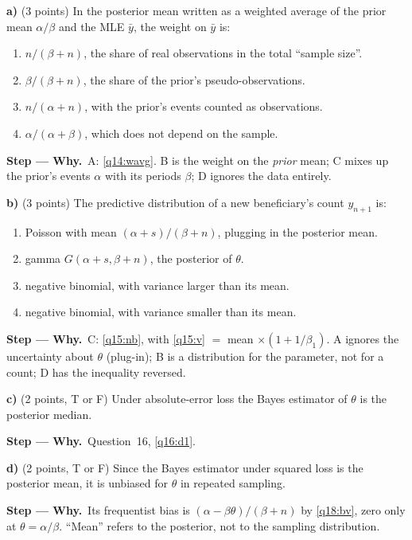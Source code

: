 \documentclass[11pt,a4paper]{article}
\newif\ifsolucoes
\numberwithin{equation}{questao}   %
\newenvironment{alternativas}{\begin{enumerate}[label=\Alph*.,leftmargin=2.2em,topsep=1pt]}{\end{enumerate}}
\newcommand{\gabarito}[1]{\ifsolucoes\par\noindent\textbf{Key:}~#1\fi}
\newcommand{\passo}[2]{\par\smallskip\noindent\textbf{Step --- #1.}~#2}
\newcommand{\1}{\mathbf{1}}
\begin{document}
\textbf{a)} (3 points) In the posterior mean written as a weighted average of the prior mean
$\alpha/\beta$ and the MLE $\bar y$, the weight on $\bar y$ is:
\begin{alternativas}
\item $n/(\beta+n)$, the share of real observations in the total ``sample size''.
\item $\beta/(\beta+n)$, the share of the prior's pseudo-observations.
\item $n/(\alpha+n)$, with the prior's events counted as observations.
\item $\alpha/(\alpha+\beta)$, which does not depend on the sample.
\end{alternativas}
\gabarito{A}
\begin{sol}
\passo{Why}{A: \eqref{q14:wavg}. B is the weight on the \emph{prior} mean; C mixes up the prior's
events $\alpha$ with its periods $\beta$; D ignores the data entirely.}
\end{sol}

\textbf{b)} (3 points) The predictive distribution of a new beneficiary's count $y_{n+1}$ is:
\begin{alternativas}
\item Poisson with mean $(\alpha+s)/(\beta+n)$, plugging in the posterior mean.
\item gamma $G(\alpha+s,\beta+n)$, the posterior of $\theta$.
\item negative binomial, with variance larger than its mean.
\item negative binomial, with variance smaller than its mean.
\end{alternativas}
\gabarito{C}
\begin{sol}
\passo{Why}{C: \eqref{q15:nb}, with \eqref{q15:v} $=$ mean $\times(1+1/\beta_1)$. A ignores the
uncertainty about $\theta$ (plug-in); B is a distribution for the parameter, not for a count;
D has the inequality reversed.}
\end{sol}

\textbf{c)} (2 points, T or F) Under absolute-error loss the Bayes estimator of $\theta$ is the
posterior median.
\gabarito{T}
\begin{sol}
\passo{Why}{Question~16, \eqref{q16:d1}.}
\end{sol}

\textbf{d)} (2 points, T or F) Since the Bayes estimator under squared loss is the posterior mean, it
is unbiased for $\theta$ in repeated sampling.
\gabarito{F}
\begin{sol}
\passo{Why}{Its frequentist bias is $(\alpha-\beta\theta)/(\beta+n)$ by \eqref{q18:bv}, zero only at
$\theta=\alpha/\beta$. ``Mean'' refers to the posterior, not to the sampling distribution.}
\end{sol}
\end{document}
